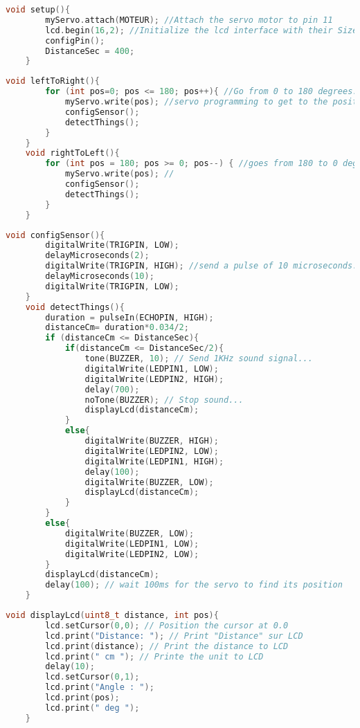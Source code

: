 \begin{lstlisting}[language=cpp,caption={Setup Funtion}]
    void setup(){
        myServo.attach(MOTEUR); //Attach the servo motor to pin 11
        lcd.begin(16,2); //Initialize the lcd interface with their Size
        configPin();
        DistanceSec = 400;
    }
\end{lstlisting}

\begin{lstlisting}[language=cpp,caption={Define leftToRight and rightToLeft Function}]
    void leftToRight(){
        for (int pos=0; pos <= 180; pos++){ //Go from 0 to 180 degrees.
            myServo.write(pos); //servo programming to get to the position(pos).
            configSensor();
            detectThings();
        }
    }
    void rightToLeft(){
        for (int pos = 180; pos >= 0; pos--) { //goes from 180 to 0 degree
            myServo.write(pos); //
            configSensor();
            detectThings();
        }
    }
\end{lstlisting}

\begin{lstlisting}[language=cpp,caption={Define detectThings and configSensor Function}]
    void configSensor(){
        digitalWrite(TRIGPIN, LOW);
        delayMicroseconds(2);
        digitalWrite(TRIGPIN, HIGH); //send a pulse of 10 microseconds.
        delayMicroseconds(10);
        digitalWrite(TRIGPIN, LOW);
    }
    void detectThings(){
        duration = pulseIn(ECHOPIN, HIGH);
        distanceCm= duration*0.034/2;
        if (distanceCm <= DistanceSec){
            if(distanceCm <= DistanceSec/2){
                tone(BUZZER, 10); // Send 1KHz sound signal...
                digitalWrite(LEDPIN1, LOW);
                digitalWrite(LEDPIN2, HIGH);
                delay(700);
                noTone(BUZZER); // Stop sound...
                displayLcd(distanceCm);
            }
            else{
                digitalWrite(BUZZER, HIGH);
                digitalWrite(LEDPIN2, LOW);
                digitalWrite(LEDPIN1, HIGH);
                delay(100);
                digitalWrite(BUZZER, LOW);
                displayLcd(distanceCm);
            }
        }
        else{
            digitalWrite(BUZZER, LOW);
            digitalWrite(LEDPIN1, LOW);
            digitalWrite(LEDPIN2, LOW);
        }
        displayLcd(distanceCm);
        delay(100); // wait 100ms for the servo to find its position
    }
\end{lstlisting}

\begin{lstlisting}[language=cpp,caption={Define displayLCD Funtion}]
    void displayLcd(uint8_t distance, int pos){
        lcd.setCursor(0,0); // Position the cursor at 0.0
        lcd.print("Distance: "); // Print "Distance" sur LCD
        lcd.print(distance); // Print the distance to LCD
        lcd.print(" cm "); // Printe the unit to LCD
        delay(10);
        lcd.setCursor(0,1);
        lcd.print("Angle : ");
        lcd.print(pos);
        lcd.print(" deg ");
    }
\end{lstlisting}